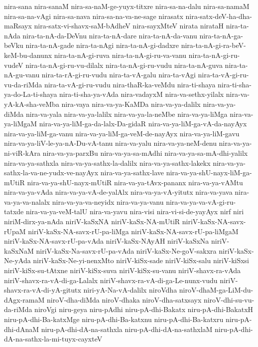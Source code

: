 {nira-sana
nira-sanaM
nira-sa-naM-ge-yuyx-titxre
nira-sa-na-dalu
nira-sa-namaM
nira-sa-na-vAgi
nira-sa-nava
nira-sa-na-va-ne-sage
nirasatx
nira-satx-deV-ha-dha-maRsayx
nira-satx-vi-shavx-saM-bAdheV
nira-sayxMteV
nirata
nirataH
nira-ta-nAda
nira-ta-nA-da-DeVnu
nira-ta-nA-dare
nira-ta-nA-da-vanu
nira-ta-nA-ga-beVku
nira-ta-nA-gade
nira-ta-nAgi
nira-ta-nA-gi-dadxre
nira-ta-nA-gi-ra-beV-keM-bu-danunx
nira-ta-nA-gi-ruva
nira-ta-nA-gi-ru-va-vanu
nira-ta-nA-gi-ru-vudeV
nira-ta-nA-gi-ru-vu-dilalx
nira-ta-nA-gi-ru-vudu
nira-ta-nA-guva
nira-ta-nA-gu-vanu
nira-ta-rA-gi-ru-vudu
nira-ta-vA-galu
nira-ta-vAgi
nira-ta-vA-gi-ru-vu-da-riMda
nira-ta-vA-gi-ru-vudu
nira-thaR-ka-veMdu
nira-ti-shaya
nira-ti-sha-ya-do-La-ti-shaya
nira-ti-sha-ya-vAda
nira-vadayxM
nira-va-sethx-yilalx
nira-va-yA-kA-sha-veMba
nira-vaya
nira-va-ya-KaMDa
nira-va-ya-dalilx
nira-va-ya-diMda
nira-va-yala
nira-va-ya-lalilx
nira-va-ya-la-neMbe
nira-va-ya-liMga
nira-va-ya-liMgaM
nira-va-ya-liM-ga-da-lalx-Da-gidaR
nira-va-ya-liM-ga-vA-da-nayAyx
nira-va-ya-liM-ga-vanu
nira-va-ya-liM-ga-veM-de-nayAyx
nira-va-ya-liM-gavu
nira-va-ya-liV-le-ya-nA-Du-vA-tanu
nira-va-yalu
nira-va-ya-neM-denu
nira-va-ya-ni-viR-kAra
nira-va-ya-parxBu
nira-va-ya-sa-mAdhi
nira-va-ya-sa-mA-dhi-yalilx
nira-va-ya-sathxla
nira-va-ya-sathx-la-dalilx
nira-va-ya-sathx-lakekx
nira-va-ya-sathx-la-va-ne-yudx-ve-nayAyx
nira-va-ya-sathx-lave
nira-va-ya-shU-nayx-liM-ga-mUtiR
nira-va-ya-shU-nayx-mUtiR
nira-va-ya-tAvx-pananx
nira-va-ya-vAMtu
nira-va-ya-vAda
nira-va-ya-vA-de-yalAlx
nira-va-ya-vA-yitutx
nira-va-yava
nira-va-ya-va-nalalx
nira-va-ya-va-neyidx
nira-va-ya-vanu
nira-va-ya-va-vA-gi-ru-tatxde
nira-va-ya-veM-talU
nira-va-yavu
nira-visi
nira-vi-si-de-yayAyx
nirf
niri
niriM-dirx-ya-nAda
niriV-kaSxNA
niriV-kaSx-NA-mUtiR
niriV-kaSx-NA-savx-rUpaM
niriV-kaSx-NA-savx-rU-pa-liMga
niriV-kaSx-NA-savx-rU-pa-liMgaM
niriV-kaSx-NA-savx-rU-pa-vAda
niriV-kaSx-NAyAH
niriV-kaSxNa
niriV-kaSxNaM
niriV-kaSx-Na-savx-rU-pa-vAda
niriV-kaSx-Ne-goV-sakxra
niriV-kaSx-Ne-yAda
niriV-kaSx-Ne-yi-nenxMto
niriV-kiSx-sade
niriV-kiSx-salu
niriV-kiSxsi
niriV-kiSx-su-tAtxne
niriV-kiSx-suva
niriV-kiSx-su-vanu
niriV-shavx-ra-vAda
niriV-shavx-ra-vA-di-ga-Lalalx
niriV-shavx-ra-vA-di-ga-Le-nunx-vudu
niriV-shavx-ra-vA-di-yA-gitutx
niri-yA-Na-vA-dalilx
niroVdha
niroV-dhaM-ga-LiM-du-dAgx-ramaM
niroV-dha-diMda
niroV-dhaka
niroV-dha-satxsayx
niroV-dhi-su-vu-da-riMda
niroVgi
niru-geya
niru-pAdhi
niru-pA-dhi-Bakatx
niru-pA-dhi-BakatxH
niru-pA-dhi-Ba-katxMge
niru-pA-dhi-Ba-katxnu
niru-pA-dhi-Ba-katxru
niru-pA-dhi-dAnaM
niru-pA-dhi-dA-na-sathxla
niru-pA-dhi-dA-na-sathxlaM
niru-pA-dhi-dA-na-sathx-la-mi-tuyx-cayxteV
}
